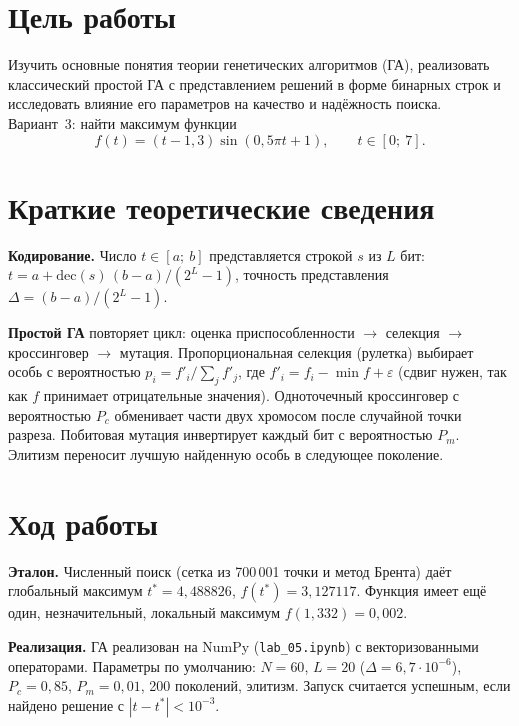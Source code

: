 \documentclass[14pt,a4paper]{extarticle}
\begin{document}

\section{Цель работы}

Изучить основные понятия теории генетических алгоритмов (ГА), реализовать классический простой ГА с представлением решений в форме бинарных строк и исследовать влияние его параметров на качество и надёжность поиска. Вариант~3: найти максимум функции
\begin{equation}
f(t) = (t - 1{,}3)\sin(0{,}5\pi t + 1), \qquad t \in [0;\ 7].
\end{equation}

\section{Краткие теоретические сведения}

\textbf{Кодирование.} Число $t \in [a;\ b]$ представляется строкой $s$ из $L$ бит: $t = a + \mathrm{dec}(s)\,(b - a)/(2^L - 1)$, точность представления $\Delta = (b - a)/(2^L - 1)$.

\textbf{Простой ГА} повторяет цикл: оценка приспособленности $\to$ селекция $\to$ кроссинговер $\to$ мутация. Пропорциональная селекция (рулетка) выбирает особь с вероятностью $p_i = f'_i / \sum_j f'_j$, где $f'_i = f_i - \min f + \varepsilon$ (сдвиг нужен, так как $f$ принимает отрицательные значения). Одноточечный кроссинговер с вероятностью $P_c$ обменивает части двух хромосом после случайной точки разреза. Побитовая мутация инвертирует каждый бит с вероятностью $P_m$. Элитизм переносит лучшую найденную особь в следующее поколение.

\section{Ход работы}

\textbf{Эталон.} Численный поиск (сетка из 700\,001 точки и метод Брента) даёт глобальный максимум $t^* = 4{,}488826$, $f(t^*) = 3{,}127117$. Функция имеет ещё один, незначительный, локальный максимум $f(1{,}332) = 0{,}002$.

\textbf{Реализация.} ГА реализован на NumPy (\texttt{lab\_05.ipynb}) с векторизованными операторами. Параметры по умолчанию: $N = 60$, $L = 20$ ($\Delta = 6{,}7 \cdot 10^{-6}$), $P_c = 0{,}85$, $P_m = 0{,}01$, 200 поколений, элитизм. Запуск считается успешным, если найдено решение с $|t - t^*| < 10^{-3}$.
\end{document}
